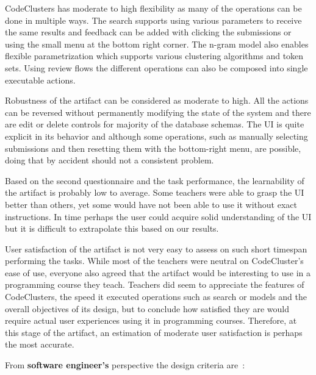 CodeClusters has moderate to high flexibility as many of the operations can be done in multiple ways. The search supports using various parameters to receive the same results and feedback can be added with clicking the submissions or using the small menu at the bottom right corner. The n-gram model also enables flexible parametrization which supports various clustering algorithms and token sets. Using review flows the different operations can also be composed into single executable actions.

Robustness of the artifact can be considered as moderate to high. All the actions can be reversed without permanently modifying the state of the system and there are edit or delete controls for majority of the database schemas. The UI is quite explicit in its behavior and although some operations, such as manually selecting submissions and then resetting them with the bottom-right menu, are possible, doing that by accident should not a consistent problem.

Based on the second questionnaire and the task performance, the learnability of the artifact is probably low to average. Some teachers were able to grasp the UI better than others, yet some would have not been able to use it without exact instructions. In time perhaps the user could acquire solid understanding of the UI but it is difficult to extrapolate this based on our results.

User satisfaction of the artifact is not very easy to assess on such short timespan performing the tasks. While most of the teachers were neutral on CodeCluster's ease of use, everyone also agreed that the artifact would be interesting to use in a programming course they teach. Teachers did seem to appreciate the features of CodeClusters, the speed it executed operations such as search or models and the overall objectives of its design, but to conclude how satisfied they are would require actual user experiences using it in programming courses. Therefore, at this stage of the artifact, an estimation of moderate user satisfaction is perhaps the most accurate.

\bigskip

\noindent
From \textbf{software engineer's} perspective the design criteria are~\cite{drs-drm, drs-gram-cockton-1996}:

